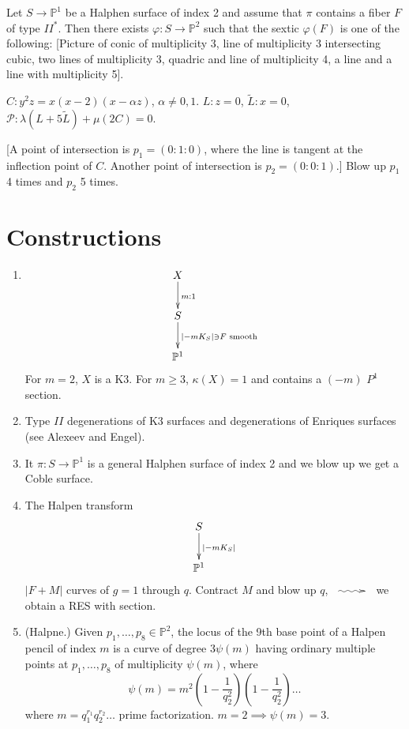 \begin{proposition}[Z]
\label{proposition-halpen}
Let $S \to \mathbb{P}^1$ be a Halphen surface
of index 2
and assume that $\pi$ contains a fiber $F$ of
type $II^*$.
Then there exists $\varphi:S \to
\mathbb{P}^2$ such that
the sextic $\varphi(F)$ is one of the
following:
[Picture of conic of multiplicity 3,
line of multiplicity 3 intersecting cubic,
two lines of multiplicity 3,
quadric and line of multiplicity 4,
a line and a line with multiplicity 5].
\end{proposition}

\begin{example}
\label{example-halphen3}
$C:y^2z=x(x-2)(x-\alpha z)$, $\alpha \neq
0,1$.
$L:z=0$,
$\tilde{L}:x=0$,
$\mathcal{P}:\lambda(L+5\tilde{L})+\mu(2C)=
0$.

[A point of intersection is $p_1=(0:1:0)$,
where the line is tangent at the inflection
point of $C$.
Another point of intersection is
$p_2=(0:0:1)$.]
Blow up $p_1$ 4 times and $p_2$ 5 times.
\end{example}

\section{Constructions}
\label{section-construction}
\begin{enumerate}
\item
$$
\xymatrix{
X\ar[d]^{m:1}\\
S \ar[d]^{|-m K_S|\ni F \text{ smooth}}\\
\mathbb{P}^1
}
$$
For  $m=2$,  $X$ is a K3. For $m\geq  3$,
$\kappa(X)=1$ and contains a $(-m)$ $P^1$
section.


\item Type $II$ degenerations of K3 surfaces
and degenerations of Enriques surfaces
(see Alexeev and Engel).

\item It $\pi:S \to \mathbb{P}^1$ is a
general Halphen surface
of index 2 and we blow up we get a Coble
surface.

\item  The Halpen transform
$$
\xymatrix{
S \ar[d]^{|-m K_S|}\\ \mathbb{P}^1
}
$$
$|F+M|$ curves of $g=1$ through $q$.
Contract $M$ and blow up $q$,
$\xymatrix{\ar@{~>}[r]&}$ we obtain a RES
with section.

\item (Halpne.)
Given $p_1,…,p_8 \in \mathbb{P}^2$,
the locus of the 9th base point of a Halpen
pencil of index $m$
is a curve of degree $3\psi(m)$
having ordinary multiple points at
$p_1,…,p_8$
of multiplicity $\psi(m)$,
where
 $$
\psi(m)=m^2\left(1-\frac{1}{q_2^2}\right)
\left(1-\frac{1}{q_2^2}\right)…
$$
where $m=q_1^{r_1}q_2^{r_2}…$
prime factorization. $m=2 \implies
\psi(m)=3$.

\end{enumerate}


